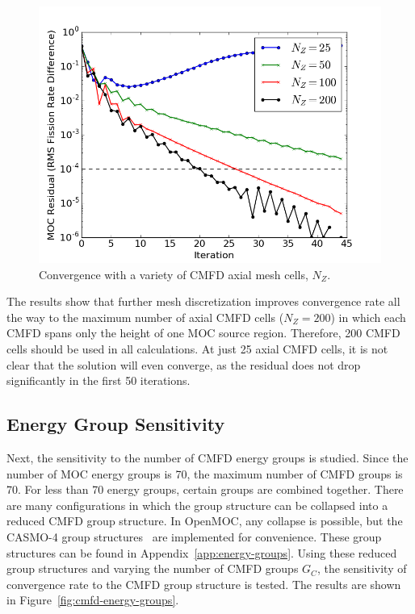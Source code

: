 \begin{figure}[h!]
	\centering
	\includegraphics[width=0.7\linewidth]{figures/results/sensitivity/cmfd-axial-cells.png}
	\caption[]{Convergence with a variety of \ac{CMFD} axial mesh cells, $N_Z$.}
	\label{fig:cmfd-axial-cells}
\end{figure}

The results show that further mesh discretization improves convergence rate all the way to the maximum number of axial \ac{CMFD} cells ($N_Z = 200$) in which each \ac{CMFD} spans only the height of one \ac{MOC} source region. Therefore, 200 \ac{CMFD} cells should be used in all calculations. At just 25 axial \ac{CMFD} cells, it is not clear that the solution will even converge, as the residual does not drop significantly in the first 50 iterations.

\newpage
\subsection{Energy Group Sensitivity}

Next, the sensitivity to the number of \ac{CMFD} energy groups is studied. Since the number of \ac{MOC} energy groups is 70, the maximum number of \ac{CMFD} groups is 70. For less than 70 energy groups, certain groups are combined together. There are many configurations in which the group structure can be collapsed into a reduced \ac{CMFD} group structure. In OpenMOC, any collapse is possible, but the CASMO-4 group structures~\cite{edenius1995casmo} are implemented for convenience. These group structures can be found in Appendix~\ref{app:energy-groups}. Using these reduced group structures and varying the number of \ac{CMFD} groups $G_C$, the sensitivity of convergence rate to the \ac{CMFD} group structure is tested. The results are shown in Figure~\ref{fig:cmfd-energy-groups}.

